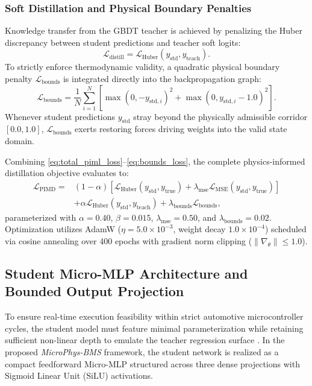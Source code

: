 \subsubsection{Soft Distillation and Physical Boundary Penalties}
Knowledge transfer from the GBDT teacher is achieved by penalizing the Huber discrepancy between student predictions and teacher soft logits:
\begin{equation}
	\label{eq:distill_loss}
	\mathcal{L}_{\text{distill}} = \mathcal{L}_{\text{Huber}}(y_{\text{std}}, y_{\text{teach}}).
\end{equation}
To strictly enforce thermodynamic validity, a quadratic physical boundary penalty $\mathcal{L}_{\text{bounds}}$ is integrated directly into the backpropagation graph:
\begin{equation}
	\label{eq:bounds_loss}
	\mathcal{L}_{\text{bounds}} = \frac{1}{N} \sum_{i=1}^{N} \left[ \max(0, -y_{\text{std},i})^2 + \max(0, y_{\text{std},i} - 1.0)^2 \right].
\end{equation}
Whenever student predictions $y_{\text{std}}$ stray beyond the physically admissible corridor $[0.0, 1.0]$, $\mathcal{L}_{\text{bounds}}$ exerts restoring forces driving weights into the valid state domain.

Combining \eqref{eq:total_piml_loss}--\eqref{eq:bounds_loss}, the complete physics-informed distillation objective evaluates to:
\begin{align}
	\label{eq:full_piml_loss_expanded}
	\mathcal{L}_{\text{PIMD}} = & (1 - \alpha) \left[ \mathcal{L}_{\text{Huber}}(y_{\text{std}}, y_{\text{true}}) + \lambda_{\text{mse}} \mathcal{L}_{\text{MSE}}(y_{\text{std}}, y_{\text{true}}) \right] \nonumber \\
	& + \alpha \mathcal{L}_{\text{Huber}}(y_{\text{std}}, y_{\text{teach}}) + \lambda_{\text{bounds}} \mathcal{L}_{\text{bounds}},
\end{align}
parameterized with $\alpha = 0.40$, $\beta = 0.015$, $\lambda_{\text{mse}} = 0.50$, and $\lambda_{\text{bounds}} = 0.02$. Optimization utilizes AdamW ($\eta = 5.0 \times 10^{-3}$, weight decay $1.0 \times 10^{-4}$) scheduled via cosine annealing over 400 epochs with gradient norm clipping ($\|\nabla_\theta\| \le 1.0$).

\subsection{Student Micro-MLP Architecture and Bounded Output Projection}
\label{sec:meth_d}

To ensure real-time execution feasibility within strict automotive microcontroller cycles, the student model must feature minimal parameterization while retaining sufficient non-linear depth to emulate the teacher regression surface \cite{lin2020mcunet}. In the proposed \textit{MicroPhys-BMS} framework, the student network is realized as a compact feedforward Micro-MLP structured across three dense projections with Sigmoid Linear Unit ($\text{SiLU}$) activations.

